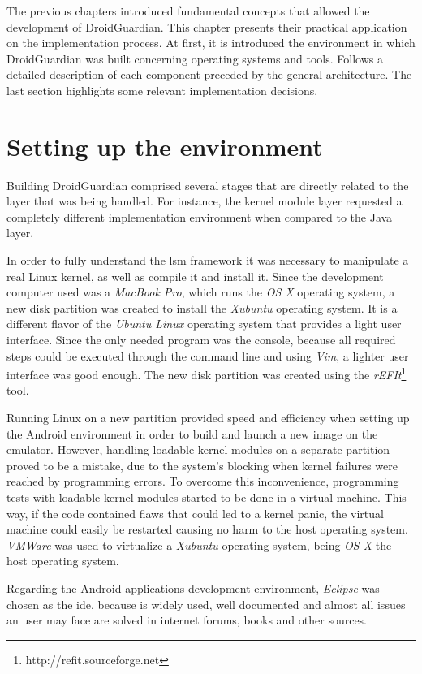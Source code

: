The previous chapters introduced fundamental concepts that allowed the development of DroidGuardian. This chapter presents their practical application on the implementation process. At first, it is introduced the environment in which DroidGuardian was built concerning operating systems and tools. Follows a detailed description of each component preceded by the general architecture. The last section highlights some relevant implementation decisions.

\section{Setting up the environment}

Building DroidGuardian comprised several stages that are directly related to the layer that was being handled. For instance, the kernel module layer requested a completely different implementation environment when compared to the Java layer.

In order to fully understand the \gls{lsm} framework it was necessary to manipulate a real Linux kernel, as well as compile it and install it. Since the development computer used was a \textit{MacBook Pro}, which runs the \textit{OS X} operating system, a new disk partition was created to install the \textit{Xubuntu} operating system. It is a different flavor of the \textit{Ubuntu Linux} operating system that provides a light user interface. Since the only needed program was the console, because all required steps could be executed through the command line and using \textit{Vim}, a lighter user interface was good enough. The new disk partition was created using the \textit{rEFIt}\footnote{http://refit.sourceforge.net} tool.

Running Linux on a new partition provided speed and efficiency when setting up the Android environment in order to build and launch a new image on the emulator. However, handling loadable kernel modules on a separate partition proved to be a mistake, due to the system's blocking when kernel failures were reached by programming errors. To overcome this inconvenience, programming tests with loadable kernel modules started to be done in a virtual machine. This way, if the code contained flaws that could led to a kernel panic, the virtual machine could easily be restarted causing no harm to the host operating system. \textit{VMWare} was used to virtualize a \textit{Xubuntu} operating system, being \textit{OS X} the host operating system.

Regarding the Android applications development environment, \textit{Eclipse} was chosen as the \gls{ide}, because is widely used, well documented and almost all issues an user may face are solved in internet forums, books and other sources.

